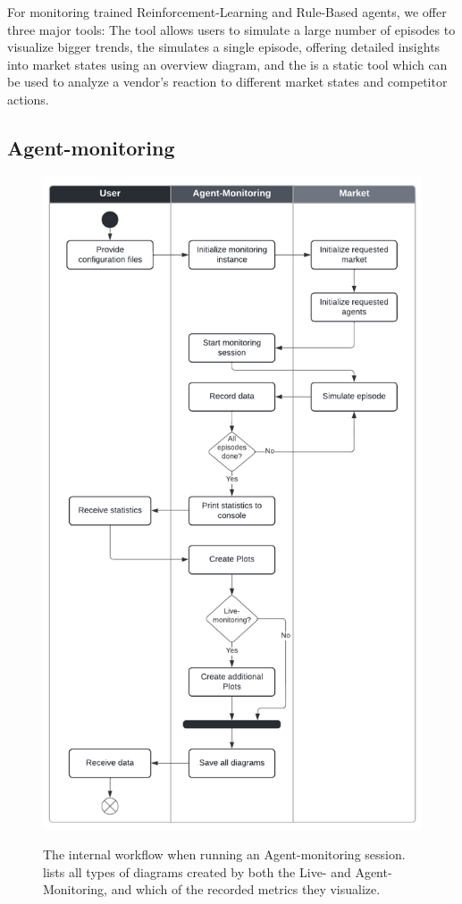 For monitoring trained Reinforcement-Learning and Rule-Based agents, we offer three major tools: The  tool allows users to simulate a large number of episodes to visualize bigger trends, the  simulates a single episode, offering detailed insights into market states using an overview diagram, and the  is a static tool which can be used to analyze a vendor's reaction to different market states and competitor actions.

\subsection*{Agent-monitoring}\label{subsec:AgentMonitoring}

\begin{figure}
	\centering
	\includegraphics[width = \textwidth]{images/swimlane_monitoring.pdf}\\
	\caption{The internal workflow when running an Agent-monitoring session.  lists all types of diagrams created by both the Live- and Agent-Monitoring, and which of the recorded metrics they visualize.}\label{fig:SwimlaneMonitoring}
\end{figure}

